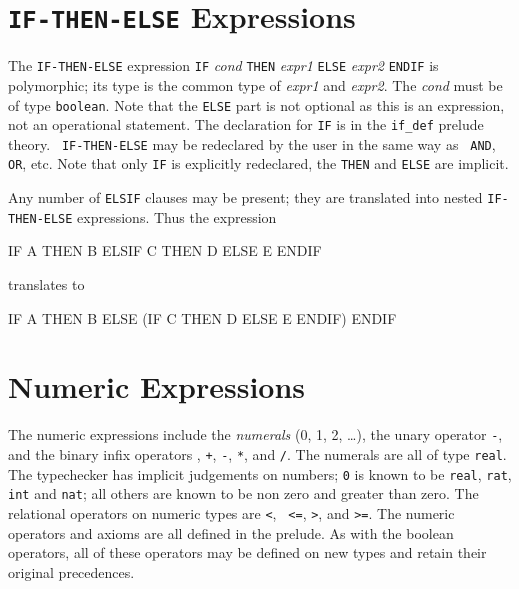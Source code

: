 

\section{\texttt{IF-THEN-ELSE} Expressions}

The \texttt{IF-THEN-ELSE} expression \texttt{IF} {\em cond\/} \texttt{THEN} {\em
expr1\/} \texttt{ELSE} {\em expr2\/} \texttt{ENDIF} is polymorphic; its type is the
common type of {\em expr1\/} and {\em expr2\/}.  The {\em cond\/} must
be of type \texttt{boolean}.  Note that the \texttt{ELSE} part is not
optional as this is an expression, not an operational statement.  The
declaration for \texttt{IF} is in the \texttt{if\_def} prelude theory.  \texttt{
IF-THEN-ELSE} may be redeclared by the user in the same way as \texttt{
AND}, \texttt{OR}, etc.  Note that only \texttt{IF} is explicitly redeclared,
the \texttt{THEN} and \texttt{ELSE} are implicit.

Any number of \texttt{ELSIF} clauses may be present; they are translated into nested
\texttt{IF-THEN-ELSE} expressions.  Thus the expression
\begin{pvsex}
  IF A THEN B
  ELSIF C THEN D
  ELSE E
  ENDIF
\end{pvsex}
%
translates to
\begin{pvsex}
  IF A THEN B
  ELSE (IF C THEN D
        ELSE E
        ENDIF)
  ENDIF
\end{pvsex}

\section{Numeric Expressions}

The numeric expressions include the \emph{numerals} (0, 1,
2, \ldots), the unary operator \texttt{-}\index{-}, and the binary infix
operators \texttt{}\index{\^}, \texttt{+}\index{+},
\texttt{-}\index{-}, \texttt{*}\index{*}, and \texttt{/}\index{/}.  The
numerals are all of type \texttt{real}.
The typechecker has implicit judgements on numbers; \texttt{0} is known to
be \texttt{real}, \texttt{rat}, \texttt{int} and \texttt{nat}; all others
are known to be non zero and greater than zero.  The relational operators
on numeric types are \texttt{<}, \texttt{
<=}, \texttt{>}, and
\texttt{>=}.  The numeric operators and axioms are
all defined in the prelude.  As with the boolean operators, all of these
operators may be defined on new types and retain their original
precedences.

